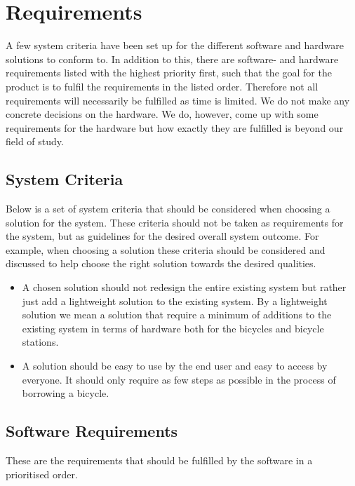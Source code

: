 \section{Requirements}
A few system criteria have been set up for the different software and hardware solutions to conform to. 
In addition to this, there are software- and hardware requirements listed with the highest priority first, such that the goal for the product is to fulfil the requirements in the listed order. 
Therefore not all requirements will necessarily be fulfilled as time is limited.
We do not make any concrete decisions on the hardware.
We do, however, come up with some requirements for the hardware but how exactly they are fulfilled is beyond our field of study.

\subsection{System Criteria}
Below is a set of system criteria that should be considered when choosing a solution for the system.
These criteria should not be taken as requirements for the system, but as guidelines for the desired overall system outcome.
For example, when choosing a solution these criteria should be considered and discussed to help choose the right solution towards the desired qualities.
\begin{itemize}
	\item A chosen solution should not redesign the entire existing system but rather just add a lightweight solution to the existing system. 
	By a lightweight solution we mean a solution that require a minimum of additions to the existing system in terms of hardware both for the bicycles and bicycle stations.
	\item A solution should be easy to use by the end user and easy to access by everyone. 
	It should only require as few steps as possible in the process of borrowing a bicycle.
\end{itemize}

\subsection{Software Requirements}
These are the requirements that should be fulfilled by the software in a prioritised order.

